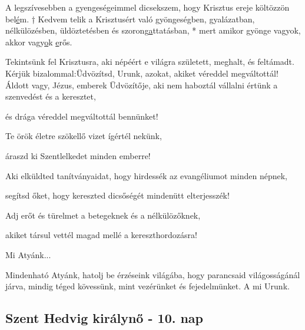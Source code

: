 \documentclass[twoside]{article}
\begin{document}
A legszívesebben a gyengeségeimmel dicsekszem, hogy Krisztus ereje költözzön bel\underline{é}m. † Kedvem telik a Krisztusért való gyöngeségben, gyalázatban, nélkülözésben, üldöztetésben és szorong\underline{a}ttatásban, * mert amikor gyönge vagyok, akkor vagy\underline{o}k \underline{e}rős.






\begin{preces}{Tekintsünk fel Krisztusra, aki népéért e világra született, meghalt, és feltámadt. Kérjük bizalommal:}{Üdvözítsd, Urunk, azokat, akiket véreddel megváltottál!}
  Áldott vagy, Jézus, emberek Üdvözítője, aki nem haboztál vállalni értünk a szenvedést és a keresztet,

  \reddash és drága véreddel megváltottál bennünket!

  Te örök életre szökellő vizet ígértél nekünk,

  \reddash áraszd ki Szentlelkedet minden emberre!

  Aki elküldted tanítványaidat, hogy hirdessék az evangéliumot minden népnek,

  \reddash segítsd őket, hogy kereszted dicsőségét mindenütt elterjesszék!

  Adj erőt és türelmet a betegeknek és a nélkülözőknek,

  \reddash akiket társul vettél magad mellé a kereszthordozásra!
\end{preces}
Mi Atyánk...

Mindenható Atyánk, hatolj be érzéseink világába, hogy parancsaid világosságánál járva, mindig téged kövessünk, mint vezérünket és fejedelmünket. A mi Urunk.


\subsection*{Szent Hedvig királynő - 10. nap}

\begin{center}\end{center}
\end{document}
